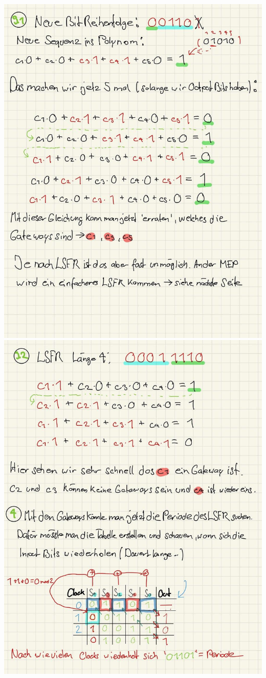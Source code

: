 \documentclass[11pt]{article}
\begin{document}
\begin{center}
	\includegraphics[scale=0.95]{img/lsfr2_2.jpg}\\
	
	\includegraphics[scale=0.95]{img/lsfr2_3.jpg}\\
	

\end{center}
\end{document}
